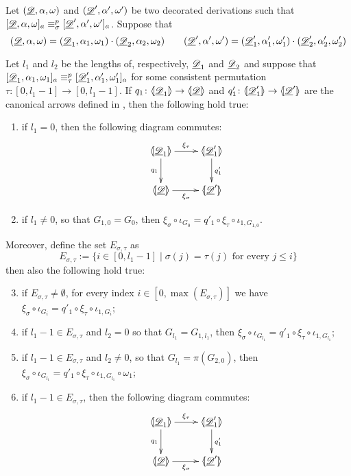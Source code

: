 \begin{lemma}\label{prop:uniqu}
	Let $(\underline{\mathscr{D}}, \alpha, \omega)$ and $(\underline{\mathscr{D}}', \alpha', \omega')$ be two decorated derivations such that $[\underline{\mathscr{D}}, \alpha, \omega]_a\equiv^p_\sigma [\underline{\mathscr{D}}', \alpha', \omega']_a $. Suppose that 
	\[(\underline{\mathscr{D}}, \alpha, \omega)=(\underline{\mathscr{D}}_1, \alpha_1, \omega_1) \cdot (\underline{\mathscr{D}}_2, \alpha_2, \omega_2) \qquad (\underline{\mathscr{D}}', \alpha', \omega')=(\underline{\mathscr{D}}'_1, \alpha'_1, \omega'_1) \cdot (\underline{\mathscr{D}}'_2, \alpha'_2, \omega'_2) \]
	
	 Let $l_1$ and $l_2$ be the lengths of, respectively, $\underline{\mathscr{D}}_1$ and $\underline{\mathscr{D}}_2$ and suppose that  $[\underline{\mathscr{D}}_1, \alpha_1, \omega_1]_a\equiv^p_\tau [\underline{\mathscr{D}}'_1, \alpha'_1, \omega'_1]_a$ for some consistent permutation $\tau\colon [0, l_1-1]\to [0,l_1-1]$.  If $q_1\colon \langle \hspace{-1.85pt}[ \underline{\mathscr{D}}_1]\hspace{-1.85pt}\rangle \to \langle \hspace{-1.85pt}[ \underline{\mathscr{D}}]\hspace{-1.85pt}\rangle$  and $q'_1\colon \langle \hspace{-1.85pt}[ \underline{\mathscr{D}}'_1]\hspace{-1.85pt}\rangle \to \langle \hspace{-1.85pt}[ \underline{\mathscr{D}}']\hspace{-1.85pt}\rangle$ are the canonical arrows defined in , then the following hold true:
	\begin{enumerate}
	\item  if $l_1=0$, then the following diagram commutes:
		\[\xymatrix{\lpro \der{D}_1\rpro \ar[r]^{\xi_\tau} \ar[d]_{q_1}& \lpro \der{D}'_1 \ar[d]^{q'_1}\rpro\\ \lpro \der{D}\rpro \ar[r]_{\xi_\sigma} & \lpro \der{D}'\rpro } \]
	\item if $l_1\neq 0$, so that $G_{1,0}=G_0$, then $\xi_\sigma \circ \iota_{G_0} = q'_1\circ \xi_{\tau} \circ  \iota_{1, G_{1,0}}$.
	\end{enumerate}
	
	Moreover, define the set $E_{\sigma, \tau}$ as
	\[E_{\sigma, \tau}:=\{i\in  [0, l_1-1] \mid \sigma(j)=\tau(j) \text{ for every } j \leq i \}\]
	then also the following hold true:
	\begin{enumerate}
		\setcounter{enumi}{2}
	\item  if $E_{\sigma, \tau}\neq \emptyset$,  for every index $i\in [0, \max(E_{\sigma, \tau})]$ we have 
	$\xi_\sigma \circ \iota_{G_i}=q'_1 \circ \xi_{\tau} \circ \iota_{1, G_i}$;
	\item if $l_1-1\in E_{\sigma, \tau}$ and $l_2=0$ so that  $G_{l_1}=G_{1, l_1}$, then 
	$\xi_\sigma \circ \iota_{G_{l_1}}=q'_1 \circ \xi_{\tau} \circ \iota_{1, G_{l_1}}$;
	\item if $l_1-1\in E_{\sigma, \tau}$ and $l_2\neq 0$, so that $G_{l_1}=\pi(G_{2,0})$, then 
	$\xi_\sigma \circ \iota_{G_{l_1}}=q'_1 \circ \xi_{\tau} \circ \iota_{1, G_{l_1}}\circ \omega_1$;
	\item if $l_1-1\in E_{\sigma, \tau}$, then the following diagram commutes:
	\[\xymatrix{\lpro \der{D}_1\rpro \ar[r]^{\xi_\tau} \ar[d]_{q_1}& \lpro \der{D}'_1 \ar[d]^{q'_1}\rpro\\ \lpro \der{D}\rpro \ar[r]_{\xi_\sigma} & \lpro \der{D}'\rpro } \]
	\end{enumerate}
\end{lemma}
